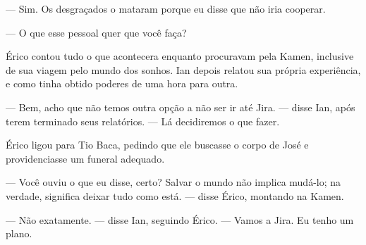 --- Sim. Os desgraçados o mataram porque eu disse que não iria cooperar.

--- O que esse pessoal quer que você faça?

Érico contou tudo o que acontecera enquanto procuravam pela Kamen,
inclusive de sua viagem pelo mundo dos sonhos. Ian depois relatou sua
própria experiência, e como tinha obtido poderes de uma hora para outra.

--- Bem, acho que não temos outra opção a não ser ir até Jira. --- disse
Ian, após terem terminado seus relatórios. --- Lá decidiremos o que
fazer.

Érico ligou para Tio Baca, pedindo que ele buscasse o corpo de José e
providenciasse um funeral adequado.

--- Você ouviu o que eu disse, certo? Salvar o mundo não implica
mudá-lo; na verdade, significa deixar tudo como está. --- disse Érico,
montando na Kamen.

--- Não exatamente. --- disse Ian, seguindo Érico. --- Vamos a Jira. Eu
tenho um plano.
